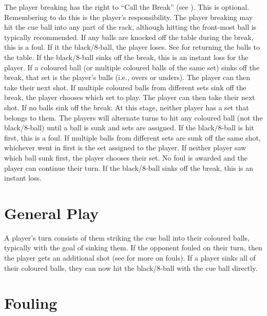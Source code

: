  \CueBallPlacement%
 The player breaking has the right to “Call the Break” (see ). This is optional. Remembering to do this is the player's responsibility.%
The player breaking may hit the cue ball into any part of the rack, although hitting the front-most ball is typically recommended.%
 \CueBallMissOffBreak[8ball]%
 \CueBallRailOffBreak%
 \CueBallSinkOffBreak%
 If any balls are knocked off the table during the break, this is a foul. If it the black/8-ball, the player loses. See  for returning the balls to the table.%
 If the black/8-ball sinks off the break, this is an instant loss for the player.%
 If a coloured ball (or multiple coloured balls of the same set) sinks off the break, that set is the player's balls (i.e., overs or unders). The player can then take their next shot.%
 If multiple coloured balls from different sets sink off the break, the player chooses which set to play. The player can then take their next shot.%
If no balls sink off the break:%
\subruleitem At this stage, neither player has a set that belongs to them. The players will alternate turns to hit any coloured ball (not the black/8-ball) until a ball is sunk and sets are assigned.%
\subruleitem If the black/8-ball is hit first, this is a foul.%
\subruleitem If multiple balls from different sets are sunk off the same shot, whichever went in first is the set assigned to the player. If neither player saw which ball sunk first, the player chooses their set. No foul is awarded and the player can continue their turn.%
 If the black/8-ball sinks off the break, this is an instant loss.%

\section{General Play} \label{8ball:general}

 A player's turn consists of them striking the cue ball into their coloured balls, typically with the goal of sinking them.%
 \FootOnGround%
 If the opponent fouled on their turn, then the player gets an additional shot (see  for more on fouls).%
 If a player sinks all of their coloured balls, they can now hit the black/8-ball with the cue ball directly.%
 \AlternateTurns[8ball]%

\section{Fouling} \label{8ball:fouling}

